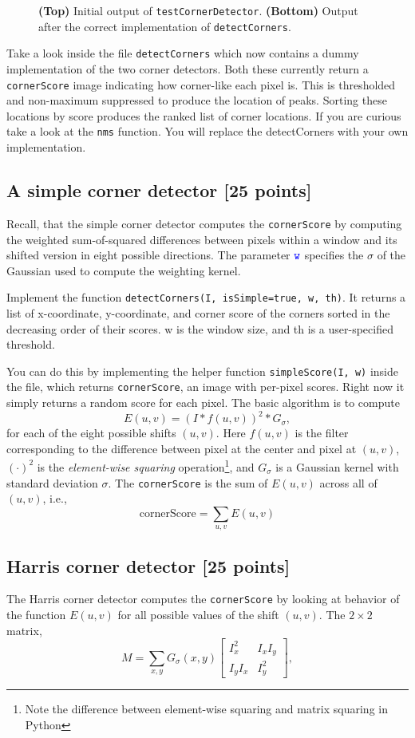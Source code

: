 \documentclass[10pt,letterpaper]{article}
\newcommand{\cmd}[1] {{\color{blue}\texttt{#1}}}
\begin{document}
\begin{figure}[h]
\caption{\label{fig:checker} \textbf{(Top)} Initial output of \cmd{testCornerDetector}. \textbf{(Bottom)} Output after the correct implementation of \cmd{detectCorners}.}
\end{figure}

Take a look inside the file \cmd{detectCorners} which now contains a
dummy implementation of the two corner detectors. Both these currently
return a
\cmd{cornerScore} image indicating how corner-like each pixel is.
This is thresholded and non-maximum suppressed to produce the
location of peaks. 
Sorting these locations by score produces the
ranked list of corner locations. If you are curious take a look at the
\cmd{nms} function.
You will replace the detectCorners with your own implementation.


\subsection{A simple corner detector [25 points]}
Recall, that the simple corner detector computes the \cmd{cornerScore} by computing the weighted sum-of-squared differences between pixels within a window and its shifted version in eight possible directions. The parameter $\cmd{w}$ specifies the $\sigma$ of the Gaussian used to compute the weighting kernel.


Implement the function \cmd{detectCorners(I, isSimple=true, w, th)}. It returns a list of x-coordinate, y-coordinate, and corner score of the corners sorted in the decreasing order of their scores. w is the window size, and th is a user-specified threshold.

You can do this by implementing the helper function \cmd{simpleScore(I, w)} inside the file, which returns \cmd{cornerScore}, an image with per-pixel scores. Right now it simply returns a random score for each pixel. The basic algorithm is to compute
\[
	E(u,v) = \left( I * f(u,v) \right)^2 * G_\sigma,
\]
for each of the eight possible shifts $(u,v)$. Here $f(u,v)$ is the filter corresponding to the difference between pixel at the center and pixel at $(u,v)$, $(\cdot)^2$ is the \emph{element-wise squaring} operation\footnote{Note the difference between element-wise squaring and matrix squaring in Python}, and $G_\sigma$ is a Gaussian kernel with standard deviation $\sigma$. The \cmd{cornerScore} is the sum of $E(u,v)$ across all of $(u,v)$, i.e., 
\[
\text{cornerScore} = \sum_{u,v} E(u,v)
\]

\subsection{Harris corner detector [25 points]}
The Harris corner detector computes the \cmd{cornerScore} by looking at behavior of the function $E(u,v)$ for all possible values of the shift $(u,v)$. The $2\times2$ matrix, 
\[
	M = \sum_{x,y} G_\sigma(x,y) \left[ 
	\begin{array}{cc}
				I_x^2 &  I_xI_y \\
				I_yI_x &  I_y^2 \end{array} 
				\right], 
\]
\end{document}
